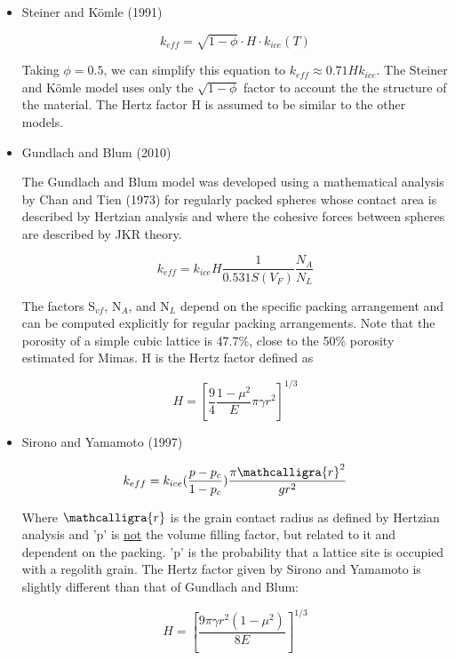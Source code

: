 \documentclass[11pt]{article} %
\newcommand{\vf}{\ensuremath{V_{F}}\xspace}
\newcommand{\sr}{\ensuremath{\mathcalligra{r}} \xspace}
\begin{document}
\begin{itemize}
\begin{itemize}
	\item Steiner and K\"{o}mle (1991)
		
		\begin{equation}
		 k_{eff} = \sqrt{1-\phi}\cdot H \cdot k_{ice}(T)
		\end{equation}
		
	Taking $\phi = 0.5$, we can simplify this equation to $ k_{eff} \approx 0.71 H k_{ice}$. The Steiner and K\"omle model uses only the $\sqrt{1-\phi}$ factor to account the the structure of the material. The Hertz factor H is assumed to be similar to the other models. 

	\item Gundlach and Blum (2010)
		
	The Gundlach and Blum model was developed using a mathematical analysis by Chan and Tien (1973) for regularly packed spheres whose contact area is described by Hertzian analysis and where the cohesive forces between spheres are described by JKR theory.
	
		\begin{equation}
		k_{eff} = k_{ice} H \frac{1}{0.531 S(\vf)} \frac{N_{A}}{N_{L}}
		\end{equation}
		
	The factors S$_{vf}$, N$_{A}$, and N$_{L}$ depend on the specific packing arrangement and can be computed explicitly for regular packing arrangements. Note that the porosity of a simple cubic lattice is 47.7\%, close to the 50\% porosity estimated for Mimas. H is the Hertz factor defined as
	
		\begin{equation}
		 H = [\frac{9}{4} \frac{1-\mu^{2}}{E} \pi \gamma r^{2} ]^{1/3}
		\end{equation}
	
	
	\item Sirono and Yamamoto (1997)
		
		\begin{equation}
		k_{eff} = k_{ice} ( \frac{p - p_{c}}{1-p_{c}} )\frac{\pi \sr^{2}}{g r^{2}}
		\end{equation}
		
		Where \sr is the grain contact radius as defined by Hertzian analysis and 'p' is \underline{not} the volume filling factor, but related to it and dependent on the packing. 'p' is the probability that a lattice site is occupied with a regolith grain. The Hertz factor given by Sirono and Yamamoto is slightly different than that of Gundlach and Blum:
		
		\begin{equation}
		H = [ \frac{9 \pi \gamma r^{2} (1-\mu^{2})}{8 E} ]^{1/3}
		\end{equation}
		

\end{itemize}
\end{itemize}
\end{document}
